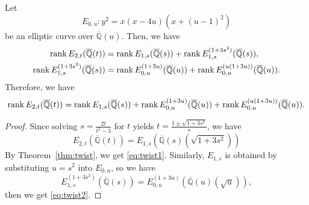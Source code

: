 \documentclass[main]{subfiles}
\begin{document}
\begin{thm}
    Let
    \begin{equation}
        E_{0,u}: y^{2} = x(x - 4u)(x + (u - 1)^{2})
    \end{equation}
    be an elliptic curve over $\overline{\mathbb{Q}}(u)$.
    Then, we have
    \begin{align}
        \operatorname{rank} E_{2,t}(\overline{\mathbb{Q}}(t))                & = \operatorname{rank} E_{1,s}(\overline{\mathbb{Q}}(s)) + \operatorname{rank} E_{1,s}^{(1 + 3s^{2})}(\overline{\mathbb{Q}}(s)), \label{eq:twist1}           \\
        \operatorname{rank} E_{1,s}^{(1 + 3s^{2})}(\overline{\mathbb{Q}}(s)) & = \operatorname{rank} E_{0,u}^{(1 + 3u)}(\overline{\mathbb{Q}}(u)) + \operatorname{rank} E_{0,u}^{(u(1 + 3u))}(\overline{\mathbb{Q}}(u)). \label{eq:twist2}
    \end{align}
    Therefore, we have
    \begin{equation}
        \operatorname{rank} E_{2,t}(\overline{\mathbb{Q}}(t)) = \operatorname{rank} E_{1,s}(\overline{\mathbb{Q}}(s)) + \operatorname{rank} E_{0,u}^{(1 + 3u)}(\overline{\mathbb{Q}}(u)) + \operatorname{rank} E_{0,u}^{(u(1 + 3u))}(\overline{\mathbb{Q}}(u)).
    \end{equation}
\end{thm}
\begin{proof}
    Since solving $s = \frac{2t}{t^{2} - 3}$ for $t$ yields $t = \frac{1 \pm \sqrt{1 + 3s^{2}}}{s}$, we have
    \begin{equation}
        E_{2,t}(\overline{\mathbb{Q}}(t)) = E_{1,s}(\overline{\mathbb{Q}}(s)(\sqrt{1 + 3s^{2}}))
    \end{equation}
    By Theorem~\ref{thm:twist}, we get \eqref{eq:twist1}.
    Similarly, $E_{1,s}$ is obtained by substituting $u = s^{2}$ into $E_{0,u}$, so we have
    \begin{equation}
        E_{1,s}^{(1 + 3s^{2})}(\overline{\mathbb{Q}}(s)) = E_{0,u}^{(1 + 3u)}(\overline{\mathbb{Q}}(u)(\sqrt{u})),
    \end{equation}
    then we get \eqref{eq:twist2}.
\end{proof}

\end{document}
